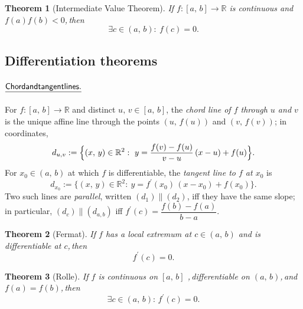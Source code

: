 \documentclass[11pt,reqno]{amsart}
\providecommand{\R}{\mathbb{R}}
\theoremstyle{redplain}
\newtheorem{theorem}{Theorem}
\begin{document}
\begin{theorem}[Intermediate Value Theorem]
\label{thm:ivt} If $f:[a,\,\allowbreak b]\to\R$ is continuous and $f(a)f(b)<0
$,\,\allowbreak then 
\begin{equation}  \label{eq:ivt}
\exists c\in(a,\,\allowbreak b):\ f(c)=0.
\end{equation}
\end{theorem}

\subsection{Differentiation theorems}

\paragraph{$\mathsf{\protect\underline{Chord and tangent lines.}}$}

\text{\ } For $f:[a,\,\allowbreak b]\to\R$ and distinct $u,\,\allowbreak v\in%
[a,\,\allowbreak b]$, the \emph{chord line of $f$ through $u$ and $v$} is
the unique affine line through the points $(u,\,\allowbreak f(u))$ and $%
(v,\,\allowbreak f(v))$; in coordinates, 
\begin{equation}  \label{eq:chord-line}
d_{u,v}:=\Bigl\{(x,\,\allowbreak y)\in\R^{2}:\ y=\frac{f(v)-f(u)}{v-u}%
\,(x-u)+f(u)\Bigr\}.
\end{equation}
For $x_0\in(a,\,\allowbreak b)$ at which $f$ is differentiable, the \emph{%
tangent line to $f$ at $x_0$} is 
\begin{equation}  \label{eq:tangent-line}
d_{x_0}:=\bigl\{(x,\,\allowbreak y)\in\R^{2}:\ y=f^{\prime
}(x_0)\,(x-x_0)+f(x_0)\bigr\}.
\end{equation}
Two such lines are \emph{parallel}, written $(d_1)\parallel (d_2)$, iff they
have the same slope; in particular, $(d_c)\parallel (d_{a,b})$ iff $%
f^{\prime }(c)=\dfrac{f(b)-f(a)}{b-a}$.

\begin{theorem}[Fermat]
\label{thm:fermat} If $f$ has a local extremum at $c\in(a,\,\allowbreak b)$
and is differentiable at $c$,\,\allowbreak then 
\begin{equation}  \label{eq:fermat}
f^{\prime }(c)=0.
\end{equation}
\end{theorem}

\begin{theorem}[Rolle]
\label{thm:rolle} If $f$ is continuous on $[a,\,\allowbreak b]$%
,\,\allowbreak differentiable on $(a,\,\allowbreak b)$,\,\allowbreak and $%
f(a)=f(b)$,\,\allowbreak then 
\begin{equation}
\exists c\in(a,\,\allowbreak b):\,f^{\prime }(c)=0.
\end{equation}
\end{theorem}
\end{document}
